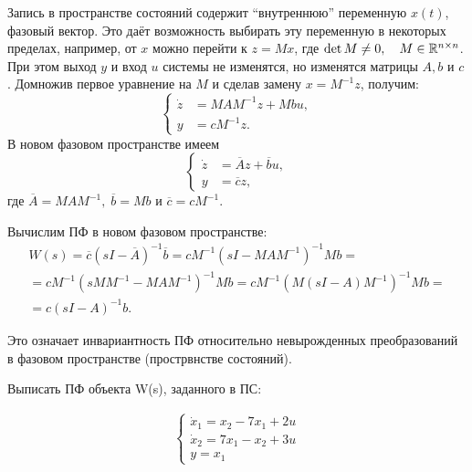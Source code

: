 \documentclass[../../TAU.tex]{subfiles}
\begin{document}
    Запись в пространстве состояний содержит ``внутреннюю'' переменную $x(t)$, фазовый вектор. Это даёт возможность выбирать эту переменную в некоторых пределах, например, от $x$ можно перейти к $z=Mx$, где 
    $\det M \neq 0,\quad M\in\mathbb{R}^{n\times n}$. 
    При этом выход $y$ и вход $u$ системы не изменятся, но изменятся матрицы $A, b$ и $c$. Домножив первое уравнение на $M$ и сделав замену 
    $x=M^{-1}z$, 
    получим:
    $$
        \left\{
        \begin{aligned}
            \dot z &=M AM^{-1}z+Mbu,\\
            y&= cM^{-1}z.
        \end{aligned}
        \right.
    $$
    В новом фазовом пространстве имеем
    $$
        \left\{
        \begin{aligned}
            \dot z &= \overline{A}z+\overline{b}u,\\
            y&= \overline{c}z,
        \end{aligned}
        \right.
    $$
    где 
    $\overline{A} = M AM^{-1},\; \overline{b} = Mb$ 
    и 
    $\overline{c}= cM^{-1}$.

    Вычислим ПФ в новом фазовом пространстве:
    \begin{multline*}
        W(s) = \overline{c}(sI-\overline{A})^{-1}\overline{b} = cM^{-1}(sI-MAM^{-1})^{-1}Mb = \\
        = c M^{-1} (sMM^{-1} - MAM^{-1})^{-1}Mb = c M^{-1}(M(sI-A)M^{-1})^{-1}Mb = \\
        =c(sI-A)^{-1}b.
    \end{multline*}

    Это означает инвариантность ПФ относительно невырожденных преобразований в фазовом пространстве (прострвнстве состояний).

    \examp
    {
        Выписать ПФ объекта W(s), заданного в ПС:

        \begin{align*}
            \begin{cases}
                \dot x_1=x_2-7x_1+2u \\
                \dot x_2=7x_1-x_2+3u \\
                y = x_1
            \end{cases}
        \end{align*}
    }
\end{document}
